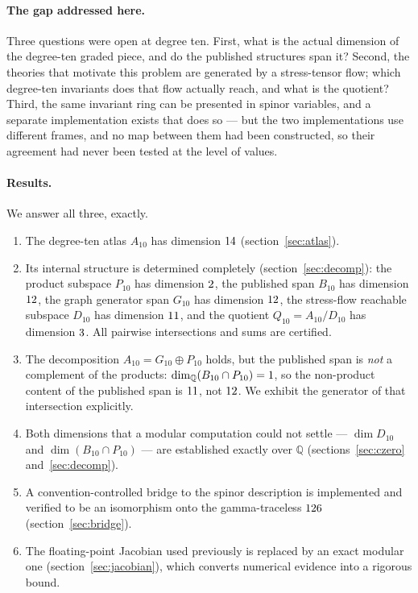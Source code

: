 \documentclass[11pt,a4paper]{article}
\begin{document}
\paragraph{The gap addressed here.} Three questions were open at degree ten.
First, what is the actual dimension of the degree-ten graded piece, and do the
published structures span it? Second, the theories that motivate this problem
are generated by a stress-tensor flow; which degree-ten invariants does that flow
actually reach, and what is the quotient? Third, the same invariant ring can be
presented in spinor variables, and a separate implementation exists that does so
--- but the two implementations use different frames, and no map between them had
been constructed, so their agreement had never been tested at the level of
values.

\paragraph{Results.} We answer all three, exactly.

\begin{enumerate}
\item The degree-ten atlas $A_{10}$ has dimension $14$
      (section~\ref{sec:atlas}).
\item Its internal structure is determined completely
      (section~\ref{sec:decomp}): the product subspace $P_{10}$ has dimension
      $2$, the published span $B_{10}$ has dimension $12$, the graph
      generator span $G_{10}$ has dimension $12$, the stress-flow reachable
      subspace $D_{10}$ has dimension $11$, and the quotient
      $Q_{10} = A_{10}/D_{10}$ has dimension $3$. All pairwise
      intersections and sums are certified.
\item The decomposition $A_{10} = G_{10}\oplus P_{10}$ holds, but the published
      span is \emph{not} a complement of the products:
      $\dim_{\mathbb{Q}}(B_{10}\cap P_{10}) = 1$, so the
      non-product content of the published span is
      $11$, not $12$. We exhibit the generator of
      that intersection explicitly.
\item Both dimensions that a modular computation could not settle ---
      $\dim D_{10}$ and $\dim(B_{10}\cap P_{10})$ --- are established exactly
      over $\mathbb{Q}$ (sections~\ref{sec:czero} and~\ref{sec:decomp}).
\item A convention-controlled bridge to the spinor description is implemented and
      verified to be an isomorphism onto the gamma-traceless
      $126$ (section~\ref{sec:bridge}).
\item The floating-point Jacobian used previously is replaced by an exact modular
      one (section~\ref{sec:jacobian}), which converts numerical evidence into a
      rigorous bound.
\end{enumerate}
\end{document}

